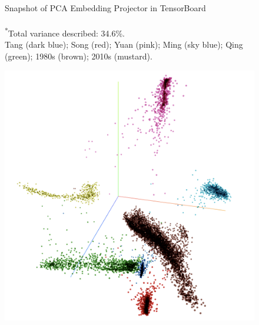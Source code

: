 \begin{figure}[H]
\begin{minipage}[b]{0.45\linewidth}
  \end{minipage}
  \caption[Snapshot of PCA Embedding Projector in TensorBoard]%
  {Snapshot of PCA Embedding Projector in TensorBoard\\%
    \footnotesize{\\\textsuperscript{*}Total variance described: 34.6\%.\\\text{*} Tang (dark blue); Song (red); Yuan (pink); Ming (sky blue); Qing (green); 1980s (brown); 2010s (mustard).}}
\end{figure}

\begin{figure}[H]
  \centering
  \begin{minipage}[b]{0.45\linewidth}
    \includegraphics[width=\textwidth]{figures_new/from_old/tsne_embedding_projector_67}
  \end{minipage}
  \quad
  \begin{minipage}[b]{0.45\linewidth}

\end{minipage}
\end{figure}
